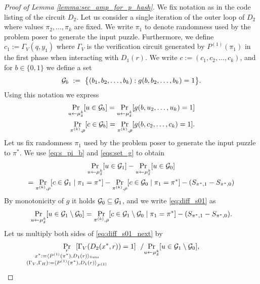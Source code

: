 \begin{proof}[Proof of Lemma \ref{lemma:sec_amp_for_p_hash}]
We fix notation as in the code listing of the circuit $D_2$.
Let us consider a single iteration of the outer loop of $D_2$ where values $\pi_2, \dotsc, \pi_k$ are fixed.
We write $\pi_1$ to denote randomness used by the problem poser to generate the input puzzle.
Furthermore, we define $c_1 := \Gamma_V(q,y_1)$ where $\Gamma_V$ is the verification circuit generated
by $P^{(1)}(\pi_1)$ in the first phase when interacting with $D_1(r)$.
We write $c := (c_1, c_2, \dotsc, c_k)$, and for $b \in \{0,1\}$ we define a set
\begin{align*}
\mathcal{G}_{b}~:=~\big\{(b_1, b_2, \dots, b_k) : g(b, b_2, \dots, b_k) = 1 \big\}.
\end{align*}
Using this notation we express
\begin{align}
  \label{eqs:set_g}
  \underset{u \leftarrow \mu_{\delta}^k}{\Pr}[u \in \mathcal{G}_b] = \underset{u \leftarrow \mu_{\delta}^k}{\Pr}[g(b, u_2, \dots, u_k) = 1]\notag\\
 \underset{\pi^{(k)}, \rho}{\Pr}[c \in \mathcal{G}_b] = \underset{\pi^{(k)}, \rho}{\Pr}[g(b, c_2, \dots, c_k) = 1].
\end{align}
Let us fix randomness $\pi_1$ used by the problem poser to generate the input puzzle to $\pi^*$.
We use \eqref{eq:s_pi_b} and \eqref{eqs:set_g} to obtain
\begin{multline}
\label{eq:diff_s01}
\underset{u \leftarrow \mu_{\delta}^k}{\Pr}[u \in \mathcal{G}_1] - \underset{u \leftarrow \mu_{\delta}^k}{\Pr}[u \in \mathcal{G}_0] \\
 = \underset{\pi^{(k)}, \rho}{\Pr}[c \in \mathcal{G}_1 \mid \pi_1 = \pi^*] - \underset{\pi^{(k)}, \rho}{\Pr}[c \in \mathcal{G}_0 \mid \pi_1 = \pi^*] - (S_{\pi^*, 1} - S_{\pi^*,0})
\end{multline}
By monotonicity of $g$ it holds $\mathcal{G}_0 \subseteq \mathcal{G}_1$, and we write \eqref{eq:diff_s01} as
\begin{align}
  \label{eq:diff_s01_next}
  \underset{u \leftarrow \mu_{\delta}^k}{\Pr}[u \in \mathcal{G}_1 \setminus \mathcal{G}_0] = \underset{\pi^{(k)}, \rho}{\Pr}[c \in \mathcal{G}_1 \setminus \mathcal{G}_0 \mid \pi_1 = \pi^*] - (S_{\pi^*,1} - S_{\pi^*,0}).
\end{align}
Let us multiply both sides of \eqref{eq:diff_s01_next} by
\begin{align*}
\underset{
  \mathclap{
    \substack{r \\ x^* := \langle P^{(1)}(\pi^*), D_1(r) \rangle_{\mathit{trans}}
    \\ (\Gamma_V, \Gamma_H) := \langle P^{(1)}(\pi^*), D_1(r) \rangle_{P^{(1)}} }}}
{\Pr}\mkern13mu [\Gamma_V(D_2(x^*, r)) = 1]
 \mkern11mu / \underset{u \leftarrow \mu_{\delta}^k}{\Pr}[ u \in \cG_1 \setminus\cG_0],

\end{align*}
\end{proof}
